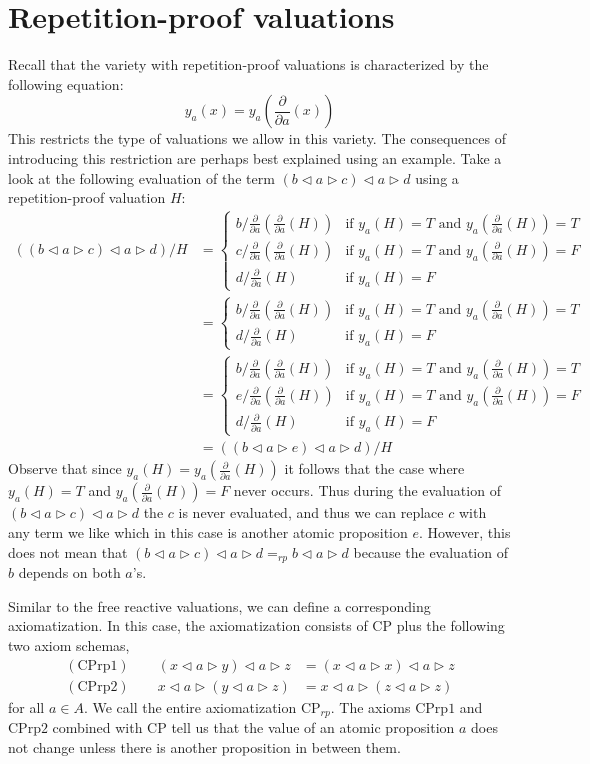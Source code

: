 \documentclass[a4paper,twoside,openright]{report}
\newcommand{\dd}[1]{\frac{\partial}{\partial #1}}
\newcommand{\CPrp}[1]{\ensuremath{\mathrm{CPrp#1}}}
\newcommand{\lef}{\ensuremath{\triangleleft}}
\newcommand{\rig}{\ensuremath{\triangleright}}
\begin{document}
\section{Repetition-proof valuations}
Recall that the variety with repetition-proof valuations is characterized by the following equation:
\[
y_a(x)=y_a(\dd a(x))
\]
This restricts the type of valuations we allow in this variety. The consequences of introducing this restriction are perhaps best explained using an example. Take a look at the following evaluation of the term $(b\lef a\rig c)\lef a\rig d$ using a repetition-proof valuation $H$:
\begin{align*}
((b\lef a\rig c)\lef a\rig d)/H
&=\begin{cases}
b/\dd a(\dd a(H)) & \text{if $y_a(H)=T$ and $y_a(\dd a(H))=T$}\\
c/\dd a(\dd a(H)) & \text{if $y_a(H)=T$ and $y_a(\dd a(H))=F$}\\
d/\dd a(H) & \text{if $y_a(H)=F$}
\end{cases}\\
&=\begin{cases}
b/\dd a(\dd a(H)) & \text{if $y_a(H)=T$ and $y_a(\dd a(H))=T$}\\
d/\dd a(H) & \text{if $y_a(H)=F$}
\end{cases}\\
&=\begin{cases}
b/\dd a(\dd a(H)) & \text{if $y_a(H)=T$ and $y_a(\dd a(H))=T$}\\
e/\dd a(\dd a(H)) & \text{if $y_a(H)=T$ and $y_a(\dd a(H))=F$}\\
d/\dd a(H) & \text{if $y_a(H)=F$}
\end{cases}\\
&=((b\lef a\rig e)\lef a\rig d)/H
\end{align*}
Observe that since $y_a(H)=y_a(\dd a(H))$ it follows that the case where $y_a(H)=T$ and $y_a(\dd a(H))=F$ never occurs. Thus during the evaluation of $(b\lef a\rig c)\lef a\rig d$ the $c$ is never evaluated, and thus we can replace $c$ with any term we like which in this case is another atomic proposition $e$. However, this does not mean that $(b\lef a\rig c)\lef a\rig d=_{rp}b\lef a\rig d$ because the evaluation of $b$ depends on both $a$'s.

Similar to the free reactive valuations, we can define a corresponding axiomatization. In this case, the axiomatization consists of CP plus the following two axiom schemas,
\begin{align*}
(\CPrp1)\qquad(x\lef a\rig y)\lef a\rig z &= (x\lef a\rig x)\lef a\rig z\\
(\CPrp2)\qquad x\lef a\rig (y\lef a\rig z) &= x\lef a\rig (z\lef a\rig z)
\end{align*}
for all $a\in A$. We call the entire axiomatization $\text{CP}_{rp}$.
The axioms \CPrp1 and \CPrp2 combined with CP tell us that the value of an atomic proposition $a$ does not change unless there is another proposition in between them.
\end{document}

